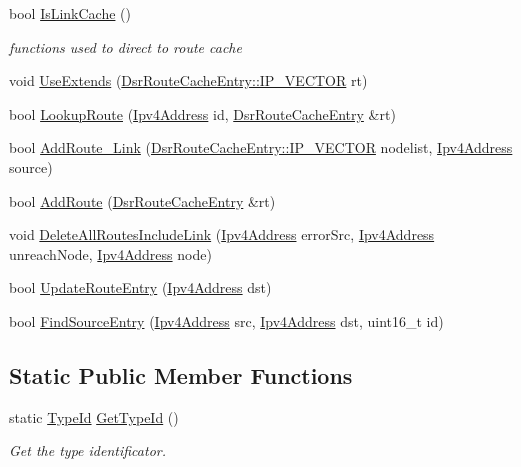 {\bf }\par
\begin{DoxyCompactItemize}
\item 
bool \hyperlink{classns3_1_1dsr_1_1DsrRouting_a857054926335441b467ee12bdf160852}{Is\+Link\+Cache} ()
\begin{DoxyCompactList}\small\item\em functions used to direct to route cache \end{DoxyCompactList}\item 
void \hyperlink{classns3_1_1dsr_1_1DsrRouting_a1488df94bd0c30e86bce947bdab5b94e}{Use\+Extends} (\hyperlink{classns3_1_1dsr_1_1DsrRouteCacheEntry_ab834177006bdbfd2e3fa607c2a88cbdf}{Dsr\+Route\+Cache\+Entry\+::\+I\+P\+\_\+\+V\+E\+C\+T\+OR} rt)
\item 
bool \hyperlink{classns3_1_1dsr_1_1DsrRouting_a9b0d6cddf99a8825289e9d142ede2379}{Lookup\+Route} (\hyperlink{classns3_1_1Ipv4Address}{Ipv4\+Address} id, \hyperlink{classns3_1_1dsr_1_1DsrRouteCacheEntry}{Dsr\+Route\+Cache\+Entry} \&rt)
\item 
bool \hyperlink{classns3_1_1dsr_1_1DsrRouting_a38898aa39e12d5e96b56f3844b163bf1}{Add\+Route\+\_\+\+Link} (\hyperlink{classns3_1_1dsr_1_1DsrRouteCacheEntry_ab834177006bdbfd2e3fa607c2a88cbdf}{Dsr\+Route\+Cache\+Entry\+::\+I\+P\+\_\+\+V\+E\+C\+T\+OR} nodelist, \hyperlink{classns3_1_1Ipv4Address}{Ipv4\+Address} source)
\item 
bool \hyperlink{classns3_1_1dsr_1_1DsrRouting_ac56ce30b5f9242c5e930b65427f852f7}{Add\+Route} (\hyperlink{classns3_1_1dsr_1_1DsrRouteCacheEntry}{Dsr\+Route\+Cache\+Entry} \&rt)
\item 
void \hyperlink{classns3_1_1dsr_1_1DsrRouting_a7e1ee018d89708bc81f1dd7181b4cd36}{Delete\+All\+Routes\+Include\+Link} (\hyperlink{classns3_1_1Ipv4Address}{Ipv4\+Address} error\+Src, \hyperlink{classns3_1_1Ipv4Address}{Ipv4\+Address} unreach\+Node, \hyperlink{classns3_1_1Ipv4Address}{Ipv4\+Address} node)
\item 
bool \hyperlink{classns3_1_1dsr_1_1DsrRouting_ab193dd688e4f334420a6ffcecf5598c5}{Update\+Route\+Entry} (\hyperlink{classns3_1_1Ipv4Address}{Ipv4\+Address} dst)
\item 
bool \hyperlink{classns3_1_1dsr_1_1DsrRouting_a5217c944c7299be31c764c533eb904d3}{Find\+Source\+Entry} (\hyperlink{classns3_1_1Ipv4Address}{Ipv4\+Address} src, \hyperlink{classns3_1_1Ipv4Address}{Ipv4\+Address} dst, uint16\+\_\+t id)
\end{DoxyCompactItemize}

\subsection*{Static Public Member Functions}
\begin{DoxyCompactItemize}
\item 
static \hyperlink{classns3_1_1TypeId}{Type\+Id} \hyperlink{classns3_1_1dsr_1_1DsrRouting_add1c578a2b05d4e9bdd3d983b2e3b4ae}{Get\+Type\+Id} ()
\begin{DoxyCompactList}\small\item\em Get the type identificator. \end{DoxyCompactList}\end{DoxyCompactItemize}

